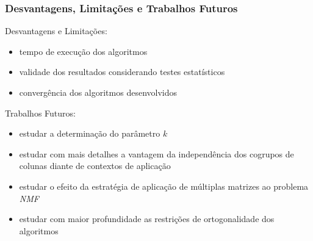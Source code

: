 \documentclass[10pt]{beamer}
\begin{document}
\begin{frame}
  \frametitle{Desvantagens, Limitações e Trabalhos Futuros}

  Desvantagens e Limitações:
  \begin{itemize}
    \item tempo de execução dos algoritmos
    \item validade dos resultados considerando testes estatísticos
    \item convergência dos algoritmos desenvolvidos
  \end{itemize}

  Trabalhos Futuros:
  \begin{itemize}
    \item estudar a determinação do parâmetro $k$
    \item estudar com mais detalhes a vantagem da independência dos cogrupos de colunas diante de contextos de aplicação
    \item estudar o efeito da estratégia de aplicação de múltiplas matrizes ao problema \textit{NMF}
    \item estudar com maior profundidade as restrições de ortogonalidade dos algoritmos
  \end{itemize}

\end{frame}





% 
% 


\begin{frame}
\titlepage %
\end{frame}


\end{document}
